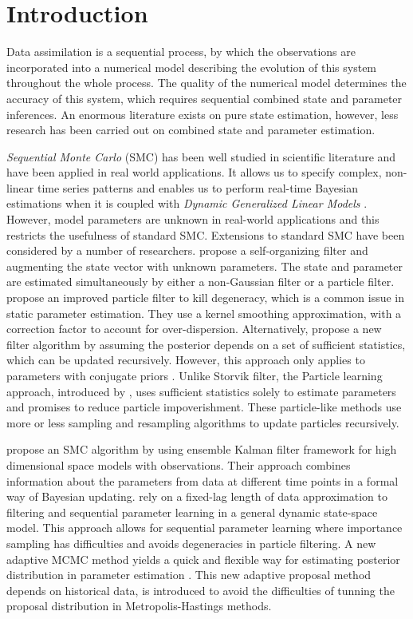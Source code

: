 
\section{Introduction}

Data assimilation is a sequential process, by which the observations are incorporated into a numerical model describing the evolution of this system throughout the whole process. The quality of the numerical model determines the accuracy of this system, which requires sequential combined state and parameter inferences. An enormous literature exists on pure state estimation, however, less research has been carried out on combined state and parameter estimation.

\textit{Sequential Monte Carlo} (SMC) has been well studied in scientific literature and have been applied in real world applications. It allows us to specify complex, non-linear time series patterns and enables us to perform real-time Bayesian estimations when it is coupled with \textit{Dynamic Generalized Linear Models} \citep{vieira2016online}. However, model parameters are unknown in real-world applications and this restricts the usefulness of standard SMC. Extensions to standard SMC have been considered by a number of researchers. \cite{kitagawa1998self} propose a self-organizing filter and augmenting the state vector with unknown parameters. The state and parameter are estimated simultaneously by either a non-Gaussian filter or a particle filter. \cite{liu2001combined} propose an improved particle filter to kill degeneracy, which is a common issue in static parameter estimation. They use a kernel smoothing approximation, with a correction factor to account for over-dispersion. Alternatively, \cite{storvik2002particle} propose a new filter algorithm by assuming the posterior depends on a set of sufficient statistics, which can be updated recursively. However, this approach only applies to parameters with conjugate priors \citep{stroud2018bayesian}. Unlike Storvik filter, the Particle learning approach, introduced by \cite{carvalho2010particle}, uses sufficient statistics solely to estimate parameters and promises to reduce particle impoverishment. These particle-like methods use more or less sampling and resampling algorithms to update particles recursively. 

\cite{stroud2018bayesian} propose an SMC algorithm by using ensemble Kalman filter framework for high dimensional space models with observations. Their approach combines information about the parameters from data at different time points in a formal way of Bayesian updating. \cite{polson2008practical} rely on a fixed-lag length of data approximation to filtering and sequential parameter learning in a general dynamic state-space model. This approach allows for sequential parameter learning where importance sampling has difficulties and avoids degeneracies in particle filtering. A new adaptive MCMC method yields a quick and flexible way for estimating posterior distribution in parameter estimation \citep{haario1999adaptive}. This new adaptive proposal method depends on historical data, is introduced to avoid the difficulties of tunning the proposal distribution in Metropolis-Hastings methods. 



